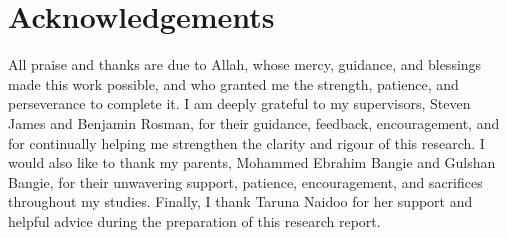\documentclass[10pt,conference]{IEEEtran}
\begin{document}
\section*{Acknowledgements}
All praise and thanks are due to Allah, whose mercy, guidance, and blessings made this work possible, and who granted me the strength, patience, and perseverance to complete it. I am deeply grateful to my supervisors, Steven James and Benjamin Rosman, for their guidance, feedback, encouragement, and for continually helping me strengthen the clarity and rigour of this research. I would also like to thank my parents, Mohammed Ebrahim Bangie and Gulshan Bangie, for their unwavering support, patience, encouragement, and sacrifices throughout my studies. Finally, I thank Taruna Naidoo for her support and helpful advice during the preparation of this research report.
\par\smallskip
\end{document}
